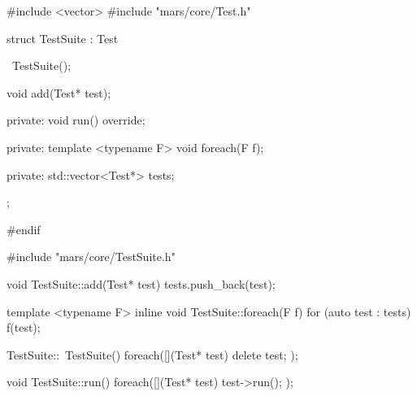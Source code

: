 \begin{content}
\begin{leftbar}
\begin{c++}[caption={\ttfamily{include/mars/core/TestSuite.h}}]
#include <vector>
#include "mars/core/Test.h"

struct TestSuite : Test {
  ~TestSuite();

  void add(Test* test);

private:
  void run() override;

private:
  template <typename F>
  void foreach(F f);

private:
  std::vector<Test*> tests;
};

#endif
 \end{c++}
\end{leftbar}

\begin{leftbar}
 \begin{c++}[caption={\ttfamily{src/mars/core/TestSuite.cc}}]
#include "mars/core/TestSuite.h"

void TestSuite::add(Test* test) {
  tests.push_back(test);
}

template <typename F>
inline void TestSuite::foreach(F f) {
  for (auto test : tests) {
    f(test);
  }
}

TestSuite::~TestSuite() {
  foreach([](Test* test) {
    delete test;
  });
}

void TestSuite::run() {
  foreach([](Test* test) {
    test->run();
  });
}
 \end{c++}
\end{leftbar}

\end{content}
